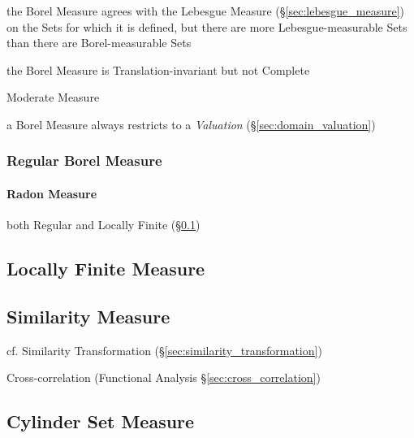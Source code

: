 the Borel Measure agrees with the Lebesgue Measure
(\S\ref{sec:lebesgue_measure}) on the Sets for which it is defined, but there
are more Lebesgue-measurable Sets than there are Borel-measurable Sets

the Borel Measure is Translation-invariant but not Complete

Moderate Measure

\fist a Borel Measure always restricts to a \emph{Valuation}
(\S\ref{sec:domain_valuation})



\subsubsection{Regular Borel Measure}\label{sec:regualr_borel}\hfill

\paragraph{Radon Measure}\label{sec:radon_measure}\hfill

both Regular and Locally Finite (\S\ref{sec:locally_finite_measure})



\subsection{Locally Finite Measure}\label{sec:locally_finite_measure}

\subsection{Similarity Measure}\label{sec:similarity_measure}

\fist cf. Similarity Transformation (\S\ref{sec:similarity_transformation})

Cross-correlation (Functional Analysis \S\ref{sec:cross_correlation})



\subsection{Cylinder Set Measure}\label{sec:cylinder_set_measure}

